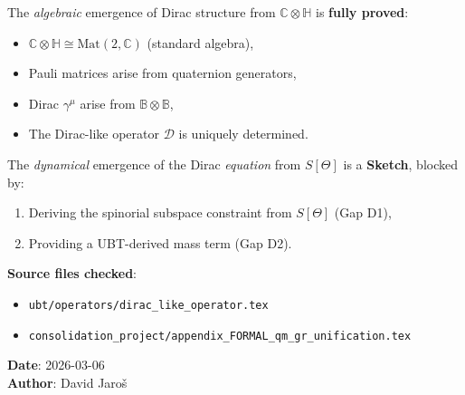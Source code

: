 \documentclass[12pt]{article}
\theoremstyle{definition}
\theoremstyle{remark}
\begin{document}
The \emph{algebraic} emergence of Dirac structure from $\mathbb{C}\otimes\mathbb{H}$ is
\textbf{fully proved}:
\begin{itemize}
  \item $\mathbb{C}\otimes\mathbb{H}\cong\mathrm{Mat}(2,\mathbb{C})$ (standard algebra),
  \item Pauli matrices arise from quaternion generators,
  \item Dirac $\gamma^\mu$ arise from $\mathbb{B}\otimes\mathbb{B}$,
  \item The Dirac-like operator $\mathcal{D}$ is uniquely determined.
\end{itemize}

The \emph{dynamical} emergence of the Dirac \emph{equation} from $S[\Theta]$ is a
\textbf{Sketch}, blocked by:
\begin{enumerate}
  \item Deriving the spinorial subspace constraint from $S[\Theta]$ (Gap D1),
  \item Providing a UBT-derived mass term (Gap D2).
\end{enumerate}

\noindent\textbf{Source files checked}:
\begin{itemize}
  \item \texttt{ubt/operators/dirac\_like\_operator.tex}
  \item \texttt{consolidation\_project/appendix\_FORMAL\_qm\_gr\_unification.tex}
\end{itemize}
\noindent\textbf{Date}: 2026-03-06\\
\textbf{Author}: David Jaroš

\ifdefined\INCLUDEMODE
\else
\end{document}
